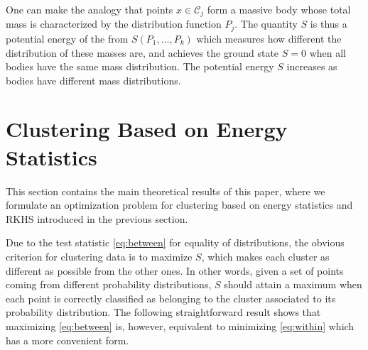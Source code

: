 \documentclass[aps,preprint,nofootinbib,floatfix]{revtex4-1}
\newcommand\C{{\mathcal{C}}}
\begin{document}
One can make the analogy 
that points $ x \in \C_j$ form a massive body 
whose total mass is characterized by the distribution function $P_j$.
The quantity $S$ is thus a potential
energy of the from $S(P_1,\dotsc,P_k)$ which measures how different
the distribution of these masses are,  and achieves the ground state
$S=0$ when all bodies have the same mass distribution. The potential energy
$S$ increases as bodies have different mass distributions.


\section{Clustering Based on Energy Statistics}
\label{sec:clustering_theory}

This section contains the main theoretical results of this paper, where 
we formulate an optimization problem for clustering 
based on energy statistics and RKHS introduced in the previous section.

Due to the test statistic \eqref{eq:between} for equality of distributions,
the obvious
criterion for clustering data is to 
maximize $S$, which makes 
each cluster as different
as possible from the other ones.
In other words, given a set of points coming from different probability
distributions, $S$ should attain a maximum when each point is correctly
classified as belonging to the cluster associated to its probability
distribution.
The following 
straightforward result
shows that maximizing \eqref{eq:between} is, however, equivalent to minimizing
\eqref{eq:within} which has a more convenient form.
\end{document}
